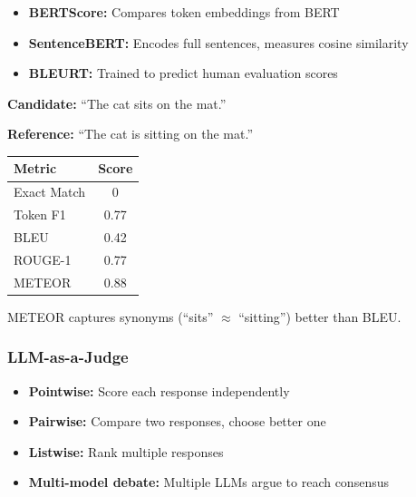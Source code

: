 \begin{defbox}
\begin{itemize}
  \item \textbf{BERTScore:} Compares token embeddings from BERT
  \item \textbf{SentenceBERT:} Encodes full sentences, measures cosine similarity
  \item \textbf{BLEURT:} Trained to predict human evaluation scores
\end{itemize}
\end{defbox}

\begin{exbox}
\textbf{Candidate:} ``The cat sits on the mat.''

\textbf{Reference:} ``The cat is sitting on the mat.''

\begin{center}
\begin{tabular}{@{} l c @{}}
\toprule
\textbf{Metric} & \textbf{Score} \\
\midrule
Exact Match & 0 \\
Token F1 & 0.77 \\
BLEU & 0.42 \\
ROUGE-1 & 0.77 \\
METEOR & 0.88 \\
\bottomrule
\end{tabular}
\end{center}

METEOR captures synonyms (``sits'' $\approx$ ``sitting'') better than BLEU.
\end{exbox}

\bigseparator

\subsubsection{LLM-as-a-Judge}

\begin{defbox}
\begin{itemize}
  \item \textbf{Pointwise:} Score each response independently
  \item \textbf{Pairwise:} Compare two responses, choose better one
  \item \textbf{Listwise:} Rank multiple responses
  \item \textbf{Multi-model debate:} Multiple LLMs argue to reach consensus
\end{itemize}
\end{defbox}

